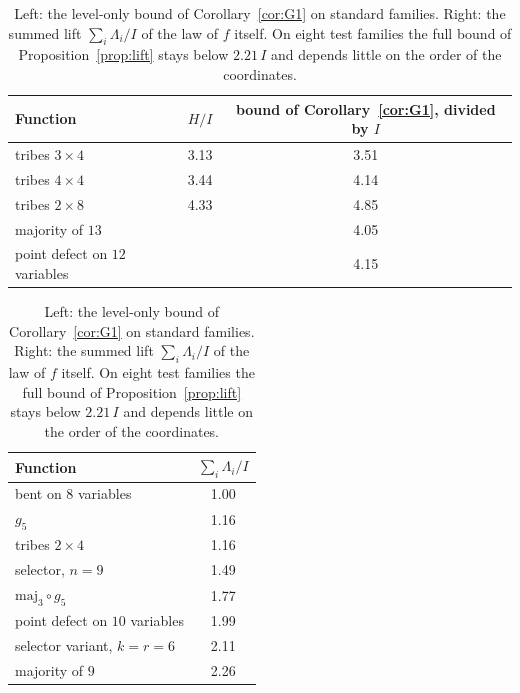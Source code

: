 \begin{table}[ht]
\centering\small
\begin{tabular}{lcc}
\toprule
Function & $H/I$ & bound of Corollary~\ref{cor:G1}, divided by $I$\\
\midrule
tribes $3\times4$ & 3.13 & 3.51\\
tribes $4\times4$ & 3.44 & 4.14\\
tribes $2\times8$ & 4.33 & 4.85\\
majority of $13$ & & 4.05\\
point defect on $12$ variables & & 4.15\\
\bottomrule
\end{tabular}
\qquad
\begin{tabular}{lc}
\toprule
Function & $\sum_i\Lambda_i/I$\\
\midrule
bent on $8$ variables & 1.00\\
$g_5$ & 1.16\\
tribes $2\times4$ & 1.16\\
selector, $n=9$ & 1.49\\
$\mathrm{maj}_3\circ g_5$ & 1.77\\
point defect on $10$ variables & 1.99\\
selector variant, $k=r=6$ & 2.11\\
majority of $9$ & 2.26\\
\bottomrule
\end{tabular}
\caption{Left: the level-only bound of Corollary~\ref{cor:G1} on standard families. Right: the summed lift $\sum_i\Lambda_i/I$ of the law of $f$ itself. On eight test families the full bound of Proposition~\ref{prop:lift} stays below $2.21\,I$ and depends little on the order of the coordinates.}
\label{tab:fei-level}
\end{table}

